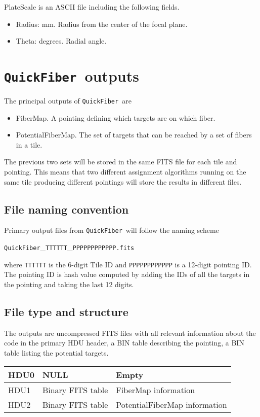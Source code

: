 \documentclass{article}
\newcommand{\code}{{\texttt{QuickFiber}}}
\begin{document}
\noindent
PlateScale is an ASCII file including the following fields.
\begin{itemize}
\item Radius: mm. Radius from the center of the focal plane.
\item Theta: degrees. Radial angle.
\end{itemize}

\section{\code\ outputs}

The principal outputs of \code\ are
\begin{itemize}
\item FiberMap. A pointing defining which targets are on which
  fiber.
\item PotentialFiberMap. The set of targets that can be reached by a
  set of fibers in a  tile.  
\end{itemize}

The previous two sets will be stored in the same FITS file for each
tile and pointing. This means that two different assignment algorithms
running on the same tile producing different pointings will store
the results in different files. 

\subsection{File naming convention}

Primary output files from \code\ will follow the naming scheme

\begin{center}
\code\_{\texttt{TTTTTT}}\_{\texttt{PPPPPPPPPPPP.fits}}
\end{center}
\noindent
where \texttt{TTTTTT} is the 6-digit Tile ID and \texttt{PPPPPPPPPPPP} is
a 12-digit pointing ID. The pointing ID is hash value computed by
adding the IDs of all the targets in the pointing and taking the last
12 digits. 

\subsection{File type and structure}
The outputs are uncompressed FITS files with all relevant
information about the code in the primary HDU header, a BIN table
describing the pointing, a BIN table listing the potential targets. 

\begin{center}
\begin{tabular}{|l|l|l|}\hline
HDU0 & NULL & Empty\\\hline
HDU1 & Binary FITS table & FiberMap information\\\hline
HDU2 & Binary FITS table & PotentialFiberMap information\\\hline
\end{tabular}
\end{center}
\end{document}
